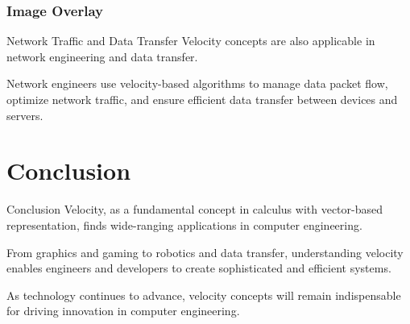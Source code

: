 \documentclass{beamer}
\begin{document}
\begin{frame}[plain]
        \frametitle{Image Overlay}
    
\end{frame}

\begin{frame}[t]{Network Traffic and Data Transfer}
\vspace{15pt}
Velocity concepts are also applicable in network engineering and data transfer.

Network engineers use velocity-based algorithms to manage data packet flow, optimize network traffic, and ensure efficient data transfer between devices and servers.
\end{frame}

\section{Conclusion}

\begin{frame}[t]{Conclusion}
Velocity, as a fundamental concept in calculus with vector-based representation, finds wide-ranging applications in computer engineering.

From graphics and gaming to robotics and data transfer, understanding velocity enables engineers and developers to create sophisticated and efficient systems.

As technology continues to advance, velocity concepts will remain indispensable for driving innovation in computer engineering.
\end{frame}
\end{document}
